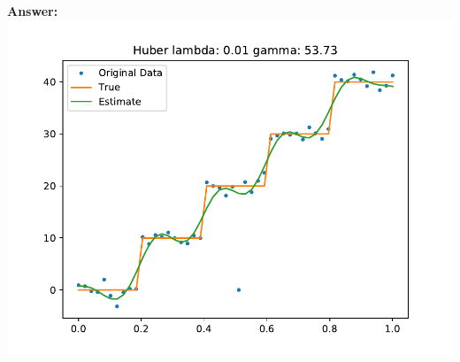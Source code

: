 \documentclass{article}
\newcommand{\1}{\mathbf{1}}
\begin{document}
\begin{enumerate}
\textbf{Answer:}\\
\includegraphics{2_huber.pdf}


\end{enumerate}
\end{document}
